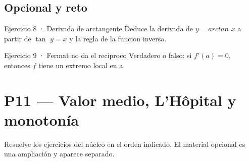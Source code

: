 \documentclass[10pt,a4paper,oneside,openany]{book}
\begin{document}
\section*{Opcional y reto}
\begin{PSevenOptionalFixed}{Ejercicio 8 · Derivada de arctangente}
Deduce la derivada de \(y=arctan\) \(x\) a partir de \(\tan\) \(y=x\) y la regla de la funcion inversa.
\end{PSevenOptionalFixed}
\begin{PSevenOptionalFixed}{Ejercicio 9 · Fermat no da el reciproco}
Verdadero o falso: si \(f'(a)=0,\) entonces \(f\) tiene un extremo local en a.
\end{PSevenOptionalFixed}
\chapter{P11 — Valor medio, L'Hôpital y monotonía}
Resuelve los ejercicios del núcleo en el orden indicado. El material opcional es una ampliación y aparece separado.
\end{document}
